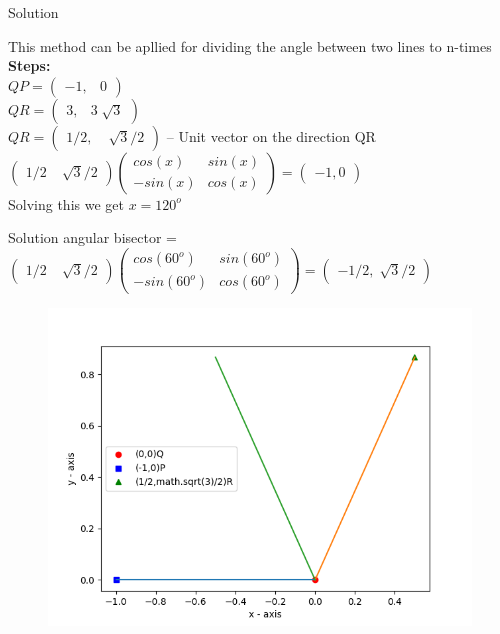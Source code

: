 \documentclass{beamer}
\begin{document}
\begin{frame}[t]{Solution}

This method can be apllied for dividing the angle between two lines to n-times\\
\textbf{Steps:}\\[5.00mm] 
$ QP = \begin{pmatrix}
    -1  ,& 0
              \end{pmatrix} $ \\[5.00mm]  $
              QR = \begin{pmatrix}
    3 ,& 3 \sqrt[]{3}
     \end{pmatrix}
 $ \\[5.00mm] 
 $
  QR = \begin{pmatrix}
    1/2 ,&\sqrt[]{3} /2
     \end{pmatrix}
 $ -- Unit vector on the direction QR \\[5.00mm] 
 $ \begin{pmatrix}
      1/2 & \sqrt[]{3} /2
              \end{pmatrix} 
\begin{pmatrix}
     cos(x) & sin(x) \\-sin(x) & cos(x)
\end{pmatrix}  = \begin{pmatrix}
    -1,0
              \end{pmatrix} 
$
\\[5.00mm] 
Solving this we get $ x = 120^{o}$ 
\end{frame}
\begin{frame}{Solution}
angular bisector = 
$ \begin{pmatrix}
      1/2 & \sqrt[]{3} /2
              \end{pmatrix} 
\begin{pmatrix}
     cos(60^{o}) & sin(60^{o}) \\-sin(60^{o}) & cos(60^{o})
\end{pmatrix}  = \begin{pmatrix}
    -1/2 , \sqrt[]{3} /2
              \end{pmatrix} $
               \begin{figure}
   \includegraphics[scale=0.4]{Figure_2.png}
\end{figure}
\end{frame}
\end{document}
